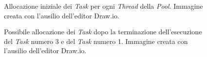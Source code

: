 \begin{figure}[H]
    \begin{center}
        
        \label{fig:ThreadPool1}
        \caption{Allocazione iniziale dei \textit{Task} per ogni \textit{Thread} della \textit{Pool}. Immagine creata con l'ausilio dell'editor Draw.io\cite{drawio}.}
    \end{center}
\end{figure}
\begin{figure}[H]
    \begin{center}
        
        \label{fig:ThreadPool2}
        \caption{Possibile allocazione dei \textit{Task} dopo la terminazione dell'esecuzione del \textit{Task} numero 3 e del \textit{Task} numero 1. Immagine creata con l'ausilio dell'editor Draw.io\cite{drawio}.}
    \end{center}
\end{figure}